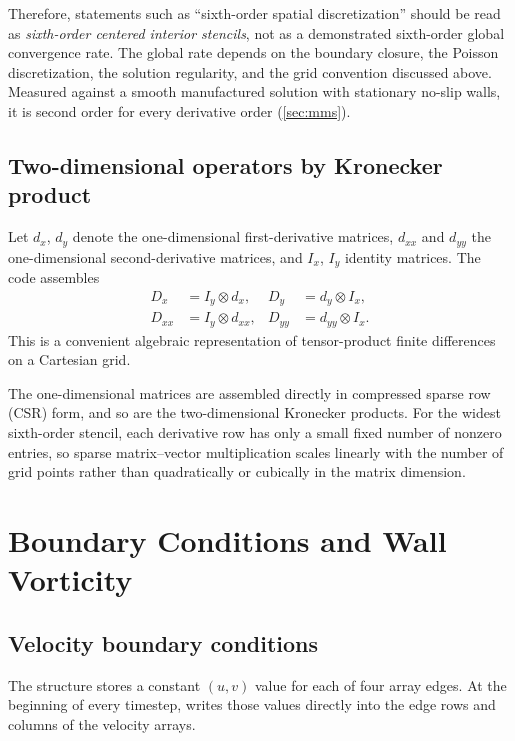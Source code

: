 \documentclass[11pt,a4paper]{article}
\newcommand{\code}[1]{\texttt{\detokenize{#1}}}
\begin{document}
Therefore, statements such as ``sixth-order spatial discretization'' should be read as \emph{sixth-order centered interior stencils}, not as a demonstrated sixth-order global convergence rate.  The global rate depends on the boundary closure, the Poisson discretization, the solution regularity, and the grid convention discussed above.  Measured against a smooth manufactured solution with stationary no-slip walls, it is second order for every derivative order (\cref{sec:mms}).

\subsection{Two-dimensional operators by Kronecker product}

Let $d_x$, $d_y$ denote the one-dimensional first-derivative matrices, $d_{xx}$ and $d_{yy}$ the one-dimensional second-derivative matrices, and $I_x$, $I_y$ identity matrices.  The code assembles
\begin{align}
D_x &= I_y\otimes d_x, &
D_y &= d_y\otimes I_x,\\
D_{xx} &= I_y\otimes d_{xx}, &
D_{yy} &= d_{yy}\otimes I_x.
\label{eq:kron-ops}
\end{align}
This is a convenient algebraic representation of tensor-product finite differences on a Cartesian grid.

The one-dimensional matrices are assembled directly in compressed sparse row (CSR) form, and so are the two-dimensional Kronecker products.  For the widest sixth-order stencil, each derivative row has only a small fixed number of nonzero entries, so sparse matrix--vector multiplication scales linearly with the number of grid points rather than quadratically or cubically in the matrix dimension.

\section{Boundary Conditions and Wall Vorticity}

\subsection{Velocity boundary conditions}

The \code{wall_bc} structure stores a constant $(u,v)$ value for each of four array edges.  At the beginning of every timestep, \code{apply_wall_bc()} writes those values directly into the edge rows and columns of the velocity arrays.
\end{document}
